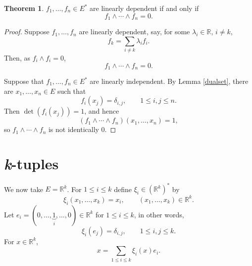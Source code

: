 \documentclass{article}
\theoremstyle{definition}
\newtheorem{theorem}{Theorem}
\theoremstyle{definition}
\begin{document}
\begin{theorem}
$f_1,\ldots,f_n \in E^*$ are linearly dependent if and only if 
\[
f_1 \wedge \cdots \wedge f_n=0.
\]
\end{theorem}
\begin{proof}
Suppose $f_1,\ldots,f_n$ are linearly dependent, say, for some
$\lambda_i \in \mathbb{R}$, $i \neq k$,
\[
f_k = \sum_{i \neq k} \lambda_i f_i.
\]
Then, as $f_i \wedge f_i =0$,
\[
f_1 \wedge \cdots \wedge f_n = 0.
\]

Suppose
that $f_1,\ldots,f_n \in E^*$ are linearly independent. 
By Lemma \ref{dualset},
there are $x_1,\ldots,x_n \in E$ such that 
\[
f_i(x_j) = \delta_{i,j},\qquad 1 \leq i, j \leq n.
\]
Then $\det (f_i(x_j)) = 1$, and hence 
\[
(f_1 \wedge \cdots \wedge f_n)(x_1,\ldots,x_n) = 1,
\]
so $f_1 \wedge \cdots \wedge f_n$ is not identically $0$.
\end{proof}





\section{{\em k}-tuples}
We now take $E=\mathbb{R}^k$.
For $1 \leq i \leq k$ define $\xi_i \in (\mathbb{R}^k)^*$ by
\[
\xi_i(x_1,\ldots,x_k) = x_i,\qquad (x_1,\ldots,x_k) \in \mathbb{R}^k.
\]
Let $e_i = (0,\ldots,\underbrace{1}_i,\ldots,0) \in \mathbb{R}^k$ for $1 \leq i \leq k$, in other words,
\[
\xi_i(e_j) = \delta_{i,j},\qquad 1 \leq i,j \leq k.
\]  
For $x \in \mathbb{R}^k$,
\[
x = \sum_{1 \leq i \leq k} \xi_i(x)e_i.
\]
\end{document}
